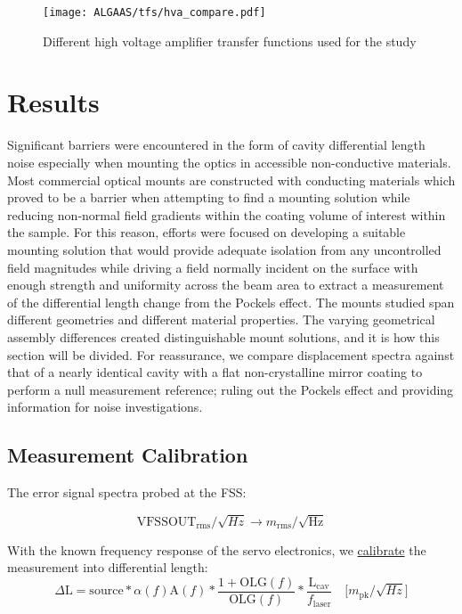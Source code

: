 \begin{figure}[H]
    \texttt{[image: ALGAAS/tfs/hva\_compare.pdf]}
    \caption{Different high voltage amplifier transfer functions used for the study}
    \label{fig:hva_compare}
\end{figure}

\section{Results}
Significant barriers were encountered in the form of cavity differential length noise especially when mounting the optics in accessible non-conductive materials. Most commercial optical mounts are constructed with conducting materials which proved to be a barrier when attempting to find a mounting solution while reducing non-normal field gradients within the coating volume of interest within the sample. For this reason, efforts were focused on developing a suitable mounting solution that would provide adequate isolation from any uncontrolled field magnitudes while driving a field normally incident on the surface with enough strength and uniformity across the beam area to extract a measurement of the differential length change from the Pockels effect. The mounts studied span different geometries and different material properties. The varying geometrical assembly differences created distinguishable mount solutions, and it is how this section will be divided. For reassurance, we compare displacement spectra against that of a nearly identical cavity with a flat non-crystalline mirror coating to perform a null measurement reference; ruling out the Pockels effect and providing information for noise investigations.

\subsection{Measurement Calibration}
The error signal spectra probed at the FSS:

\begin{equation}
\mathrm{VFSSOUT}_\mathrm{rms}/\sqrt{Hz} \rightarrow m_\mathrm{rms}/\sqrt{\mathrm{Hz}}
\end{equation}

With the known frequency response of the servo electronics, we \hyperref[sec:calibration]{calibrate} the measurement into differential length:
\begin{equation}
	\Delta \mathrm{L} = \mathrm{source}*\alpha(f) \mathrm{A}(f)*\frac{1+\mathrm{OLG}(f)}{\mathrm{OLG}(f)}*\frac{\mathrm{L_{cav}}}{f_\mathrm{laser}} \quad \big[ m_\mathrm{pk} / \sqrt{Hz} \big]
\end{equation}

